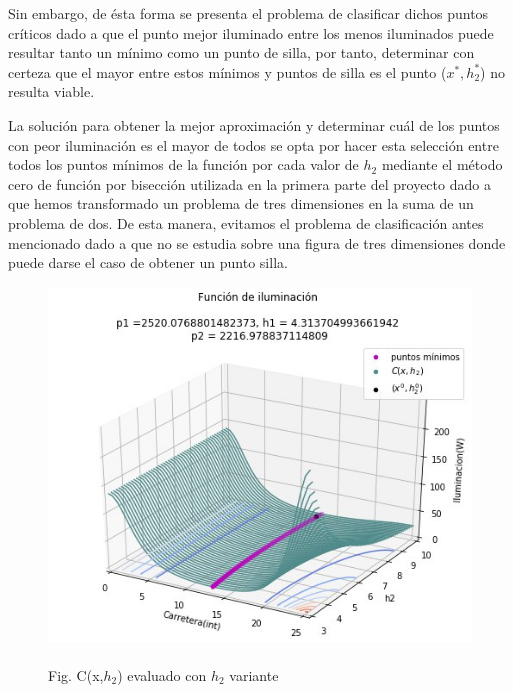 \documentclass[11pt]{article}
\begin{document}
\begin{enumerate}
        Sin embargo, de ésta forma se presenta el problema de clasificar dichos puntos críticos dado a que el punto mejor iluminado entre los menos iluminados puede resultar tanto un mínimo como un punto de silla, por tanto, determinar con certeza que el mayor entre estos mínimos y puntos de silla es el punto ($x^*,h^*_2$) no resulta viable. 
        
        La solución para obtener la mejor aproximación y determinar cuál de los puntos con peor iluminación es el mayor de todos se opta por hacer esta selección entre todos los puntos mínimos de la función por cada valor de $h_2$ mediante el método cero de función por bisección utilizada en la primera parte del proyecto dado a que hemos transformado un problema de tres dimensiones en la suma de un problema de dos. De esta manera, evitamos el problema de clasificación antes mencionado dado a que no se estudia sobre una figura de tres dimensiones donde puede darse el caso de obtener un punto silla.
        \begin{figure}[!h]
        	\includegraphics[h,keepaspectratio, width=13cm]{Imagenes/parte2.jpg}
        	\caption{\\Fig. C(x,$h_2$) evaluado con $h_2$ variante \label{fig:grafica3}}
        \end{figure}


\end{enumerate}
\end{document}
